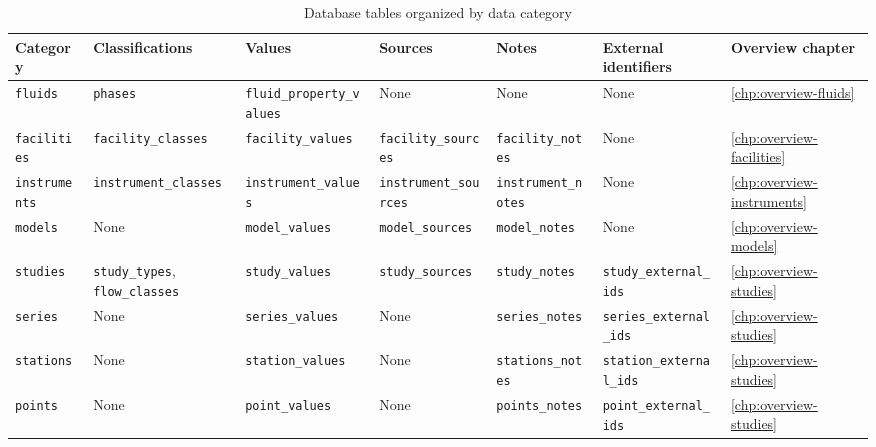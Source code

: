 \begin{landscape}
\begin{table}[p]
    \centering
    \scriptsize
    \begin{tabular}{ l | l l l l l l }
        Category              & Classifications                              & Values                           & Sources                      & Notes                      & External identifiers            & Overview chapter \\
        \hline
        \texttt{fluids}      & \texttt{phases}                               & \texttt{fluid\_property\_values} & None                         & None                       & None                            & \ref{chp:overview-fluids} \\
        \texttt{facilities}  & \texttt{facility\_classes}                    & \texttt{facility\_values}        & \texttt{facility\_sources}   & \texttt{facility\_notes}   & None                            & \ref{chp:overview-facilities} \\
        \texttt{instruments} & \texttt{instrument\_classes}                  & \texttt{instrument\_values}      & \texttt{instrument\_sources} & \texttt{instrument\_notes} & None                            & \ref{chp:overview-instruments} \\
        \texttt{models}      & None                                          & \texttt{model\_values}           & \texttt{model\_sources}      & \texttt{model\_notes}      & None                            & \ref{chp:overview-models} \\
        \texttt{studies}     & \texttt{study\_types}, \texttt{flow\_classes} & \texttt{study\_values}           & \texttt{study\_sources}      & \texttt{study\_notes}      & \texttt{study\_external\_ids}   & \ref{chp:overview-studies} \\
        \texttt{series}      & None                                          & \texttt{series\_values}          & None                         & \texttt{series\_notes}     & \texttt{series\_external\_ids}  & \ref{chp:overview-studies} \\
        \texttt{stations}    & None                                          & \texttt{station\_values}         & None                         & \texttt{stations\_notes}   & \texttt{station\_external\_ids} & \ref{chp:overview-studies} \\
        \texttt{points}      & None                                          & \texttt{point\_values}           & None                         & \texttt{points\_notes}     & \texttt{point\_external\_ids}   & \ref{chp:overview-studies}
    \end{tabular}
    \caption{Database tables organized by data category}
    \label{tab:database-tables}
\end{table}
\end{landscape}


